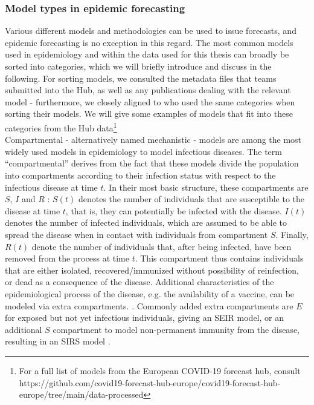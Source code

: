 \subsubsection{Model types in epidemic forecasting}
Various different models and methodologies can be used to issue forecasts, and epidemic forecasting is no exception in this regard. The most common models used in epidemiology and within the data used for this thesis can broadly be sorted into categories, which we will briefly introduce and discuss in the following. For sorting models, we consulted the metadata files that teams submitted into the Hub, as well as any publications dealing with the relevant model - furthermore, we closely aligned to \cite{bracher_pre-registered_2021} who used the same categories when sorting their models. We will give some examples of models that fit into these categories from the Hub data\footnote{For a full list of models from the European COVID-19 forecast hub, consult https://github.com/covid19-forecast-hub-europe/covid19-forecast-hub-europe/tree/main/data-processed}\\
Compartmental - alternatively named mechanistic - models are among the most widely used models in epidemiology to model infectious diseases. The term ``compartmental'' derives from the fact that these models divide the population into compartments according to their infection status with respect to the infectious disease at time $t$. In their most basic structure, these compartments are $S$, $I$ and $R$ \citep{brauer_epidemic_2012}: $S(t)$ denotes the number of individuals that are susceptible to the disease at time $t$, that is, they can potentially be infected with the disease. $I(t)$ denotes the number of infected individuals, which are assumed to be able to spread the disease when in contact with individuals from compartment $S$. Finally, $R(t)$ denote the number of individuals that, after being infected, have been removed from the process at time $t$. This compartment thus contains individuals that are either isolated, recovered/immunized without possibility of reinfection, or dead as a consequence of the disease. Additional characteristics of the epidemiological process of the disease, e.g. the availability of a vaccine, can be modeled via extra compartments. . Commonly added extra compartments are $E$ for exposed but not yet infectious individuals, giving an SEIR model, or an additional $S$ compartment to model non-permanent immunity from the disease, resulting in an SIRS model \citep{brauer_epidemic_2012}. \\

